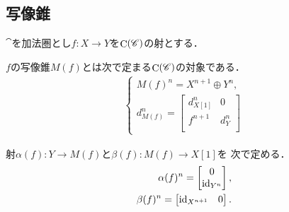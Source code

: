 \subsection{写像錐}
$\cat$を加法圏とし$f\colon X\to Y$を$\mathop{\mathrm{C}}\nolimits(\mathscr{C})$の射とする．
\begin{Definition}
    $f$の写像錐$M(f)$とは次で定まる$\mathop{\mathrm{C}}\nolimits(\mathscr{C})$の対象である．
    \begin{align*}
        \begin{cases}
            M(f)^n=X^{n+1}\oplus Y^{n},\\
            d^{n}_{M(f)}=\begin{bmatrix*}
                d_{X[1]}^n & 0\\
                f^{n+1} & d_Y^n\\
            \end{bmatrix*}
        \end{cases}
    \end{align*}
\end{Definition}

射$\alpha(f)\colon Y\to M(f)$と$\beta(f)\colon M(f)\to X[1]$を
次で定める．
\begin{align}
    \alpha(f)^{n}=\begin{bmatrix*}
        0\\\id_{Y^n}
    \end{bmatrix*},\\
    \beta(f)^{n}=\begin{bmatrix*}
        \id_{X^{n+1}}&0
    \end{bmatrix*}.
\end{align}

